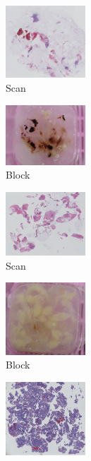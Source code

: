 \documentclass[letterpaper,10pt,oneside]{article}
\begin{document}
\begin{figure}[hbtp]
	\centering
  \begin{subfigure}[b]{.2\textwidth}
    \includegraphics[width=3cm]{images/PO13-00516A1_1_7_201305171148.png}
    \caption{Scan}
  \end{subfigure}
  \begin{subfigure}[b]{.2\textwidth}
	  \includegraphics[width=3cm]{images/PO1300516_A1.JPG}
    \caption{Block}
  \end{subfigure}
  \begin{subfigure}[b]{.2\textwidth}
	  \includegraphics[width=3cm]{images/PO14-00496A1Level1_1_2_201404181459.png} 
    \caption{Scan}
  \end{subfigure}
  \begin{subfigure}[b]{.2\textwidth}
	  \includegraphics[width=3cm]{images/PO1400496_A1.JPG} 
    \caption{Block}
  \end{subfigure}
  \begin{subfigure}[b]{.2\textwidth}
	  \includegraphics[width=3cm]{images/PO14-00482B3_1_2_201404171123.png} 

\end{subfigure}
\end{figure}
\end{document}
